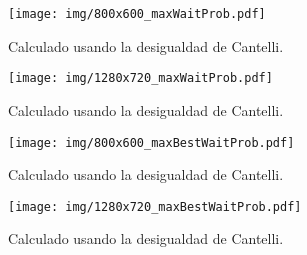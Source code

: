 \begin{figure}[h]

	\texttt{[image: img/800x600\_maxWaitProb.pdf]}
	\caption{Calculado usando la desigualdad de Cantelli.}

\end{figure}

\begin{figure}[h]

	\texttt{[image: img/1280x720\_maxWaitProb.pdf]}
	\caption{Calculado usando la desigualdad de Cantelli.}

\end{figure}

\begin{figure}[h]

	\texttt{[image: img/800x600\_maxBestWaitProb.pdf]}
	\caption{Calculado usando la desigualdad de Cantelli.}

\end{figure}

\begin{figure}[h]

	\texttt{[image: img/1280x720\_maxBestWaitProb.pdf]}
	\caption{Calculado usando la desigualdad de Cantelli.}

\end{figure}
